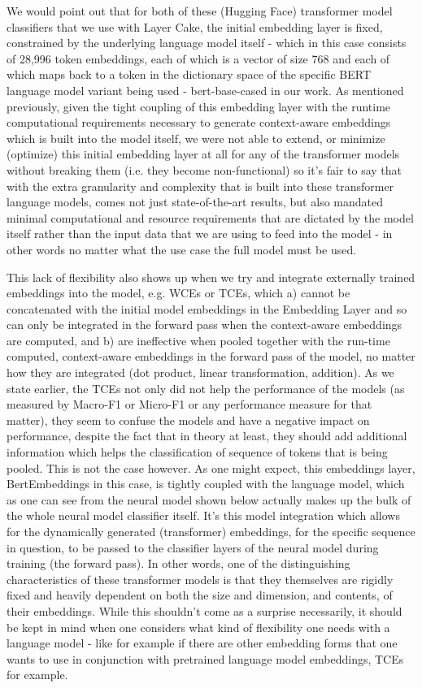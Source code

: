 \documentclass[final]{clv2025}
\begin{document}
We would point out that for both of these (Hugging Face) transformer model classifiers that we use with Layer Cake, the initial embedding layer is fixed, constrained by the underlying language model itself - which in this case consists of 28,996 token embeddings, each of which is a vector of size 768 and each of which maps back to a token in the dictionary space of the specific BERT language model variant being used - bert-base-cased in our work. As mentioned previously, given the tight coupling of this embedding layer with the runtime computational requirements necessary to generate context-aware embeddings which is built into the model itself, we were not able to extend, or minimize (optimize) this initial embedding layer at all for any of the transformer models without breaking them (i.e. they become non-functional) so it's fair to say that with the extra granularity and complexity that is built into these transformer language models, comes not just state-of-the-art results, but also mandated minimal computational and resource requirements that are dictated by the model itself rather than the input data that we are using to feed into the model - in other words no matter what the use case the full model must be used. 

This lack of flexibility also shows up when we try and integrate externally trained embeddings into the model, e.g. WCEs or TCEs, which a) cannot be concatenated with the initial model embeddings in the Embedding Layer and so can only be integrated in the forward pass when the context-aware embeddings are computed, and b) are ineffective when pooled together with the run-time computed, context-aware embeddings in the forward pass of the model, no matter how they are integrated (dot product, linear transformation, addition). As we state earlier, the TCEs not only did not help the performance of the models (as measured by Macro-F1 or Micro-F1 or any performance measure for that matter), they seem to confuse the models and have a negative impact on performance, despite the fact that in theory at least, they should add additional information which helps the classification of sequence of tokens that is being pooled. This is not the case however. As one might expect, this embeddings layer, BertEmbeddings in this case, is tightly coupled with the language model, which as one can see from the neural model shown below actually makes up the bulk of the whole neural model classifier itself. It's this model integration which allows for the dynamically generated (transformer) embeddings, for the specific sequence in question, to be passed to the classifier layers of the neural model during training (the forward pass). In other words, one of the distinguishing characteristics of these transformer models is that they themselves are rigidly fixed and heavily dependent on both the size and dimension, and contents, of their embeddings. While this shouldn't come as a surprise necessarily, it should be kept in mind when one considers what kind of flexibility one needs with a language model - like for example if there are other embedding forms that one wants to use in conjunction with pretrained language model embeddings, TCEs for example.
\end{document}
